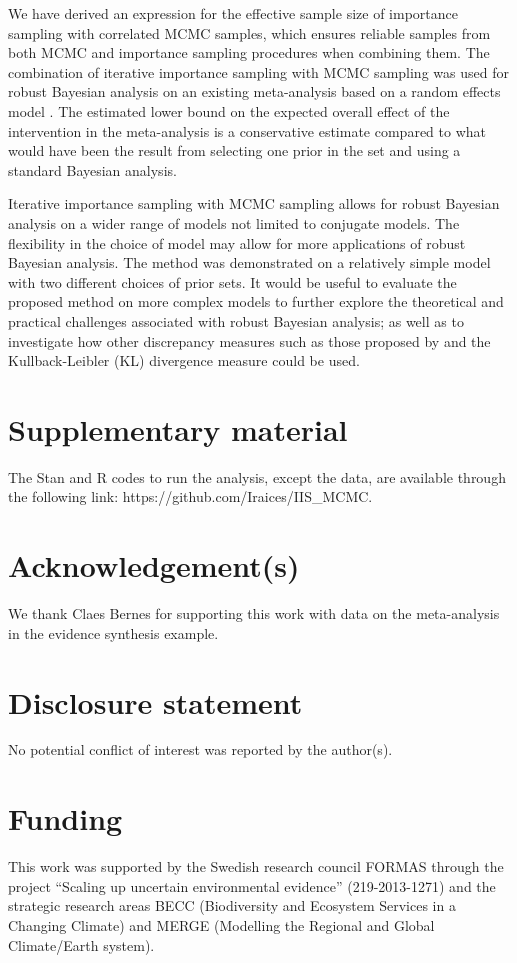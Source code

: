\documentclass{amsart}
\theoremstyle{plain}%
\begin{document}
We have derived an expression for the effective sample size of importance sampling with correlated MCMC samples, which ensures reliable samples from both MCMC and importance sampling procedures when combining them. The combination of iterative importance sampling with MCMC sampling was used for robust Bayesian analysis on an existing meta-analysis based on a random effects model \citep{Bernes_2015}. The estimated lower bound on the expected overall effect of the intervention in the meta-analysis is a conservative estimate compared to what would have been the result from selecting one prior in the set and using a standard Bayesian analysis.

Iterative importance sampling with MCMC sampling 
allows for robust Bayesian analysis on a wider range of models not limited to conjugate models. The flexibility in the choice of model may allow for more applications of robust Bayesian analysis. The method was demonstrated on a relatively simple model with two different choices of prior sets.
It would be useful to evaluate the proposed method on more complex models to further explore the theoretical and practical challenges associated with robust Bayesian analysis; as well as to investigate how other discrepancy measures such as those proposed by \citep{Martino_2017} and the Kullback-Leibler (KL) divergence measure could be used.

\section*{Supplementary material}

The Stan and R codes to run the analysis, except the data, are available through the following link: https://github.com/Iraices/IIS\_MCMC.  

\section*{Acknowledgement(s)}
We thank Claes Bernes for supporting this work with data on the meta-analysis in the evidence synthesis example. 

\section*{Disclosure statement}
No potential conflict of interest was reported by the author(s).

\section*{Funding}
This work was supported by the Swedish research council FORMAS through the project ``Scaling up uncertain environmental evidence'' (219-2013-1271) and the strategic research areas BECC (Biodiversity and  Ecosystem Services in a Changing Climate) and MERGE (Modelling the Regional and Global Climate/Earth system).
\end{document}
